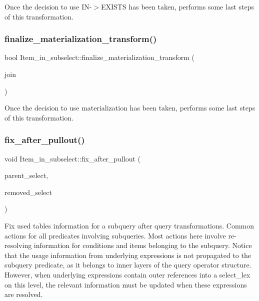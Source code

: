 Once the decision to use IN-\/$>$E\+X\+I\+S\+TS has been taken, performs some last steps of this transformation. \mbox{\label{classItem__in__subselect_abfa2e861d58c2ac7b68875720070ad98}} 
\subsubsection{\texorpdfstring{finalize\+\_\+materialization\+\_\+transform()}{finalize\_materialization\_transform()}}
{\footnotesize\ttfamily bool Item\+\_\+in\+\_\+subselect\+::finalize\+\_\+materialization\+\_\+transform (\begin{DoxyParamCaption}\item[{\mbox{\hyperlink{classJOIN}{J\+O\+IN}} $\ast$}]{join }\end{DoxyParamCaption})}

Once the decision to use materialization has been taken, performs some last steps of this transformation. \mbox{\label{classItem__in__subselect_aa6c971974969097521a5a736ea6eed02}} 
\subsubsection{\texorpdfstring{fix\+\_\+after\+\_\+pullout()}{fix\_after\_pullout()}}
{\footnotesize\ttfamily void Item\+\_\+in\+\_\+subselect\+::fix\+\_\+after\+\_\+pullout (\begin{DoxyParamCaption}\item[{st\+\_\+select\+\_\+lex $\ast$}]{parent\+\_\+select,  }\item[{st\+\_\+select\+\_\+lex $\ast$}]{removed\+\_\+select }\end{DoxyParamCaption})\hspace{0.3cm}{\ttfamily [virtual]}}

Fix used tables information for a subquery after query transformations. Common actions for all predicates involving subqueries. Most actions here involve re-\/resolving information for conditions and items belonging to the subquery. Notice that the usage information from underlying expressions is not propagated to the subquery predicate, as it belongs to inner layers of the query operator structure. However, when underlying expressions contain outer references into a select\+\_\+lex on this level, the relevant information must be updated when these expressions are resolved. 


